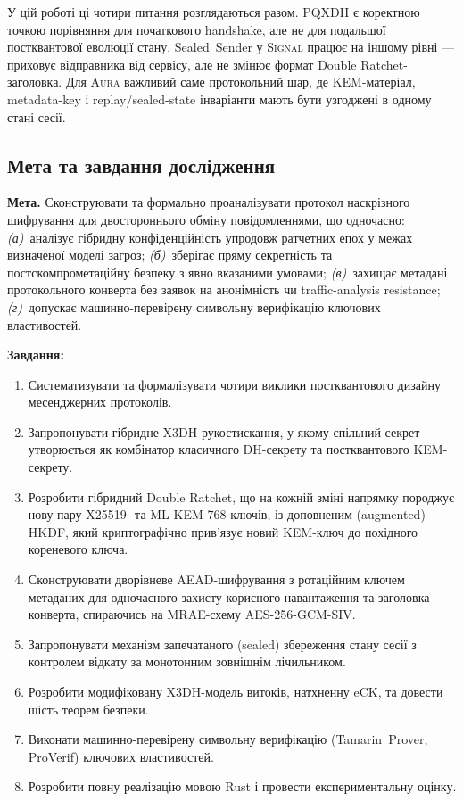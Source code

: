 \documentclass[11pt,a4paper]{article}
\theoremstyle{definition}
\newcommand{\AEAD}{\textsf{AES-256-GCM-SIV}}
\renewcommand{\DH}{\textsf{X25519}}
\newcommand{\KEM}{\textsf{ML-KEM-768}}
\newcommand{\eCK}{\textsf{eCK}}
\newcommand{\Aura}{\mbox{\normalfont\scshape Aura}}
\newcommand{\Signal}{\mbox{\normalfont\scshape Signal}}
\begin{document}
\medskip
У цій роботі ці чотири питання розглядаються разом. PQXDH є коректною
точкою порівняння для початкового handshake, але не для подальшої
постквантової еволюції стану. Sealed~Sender у \Signal{} працює на
іншому рівні — приховує відправника від сервісу, але не змінює формат
Double Ratchet-заголовка. Для \Aura{} важливий саме протокольний шар,
де KEM-матеріал, metadata-key і replay/sealed-state інваріанти мають
бути узгоджені в одному стані сесії.

\subsection{Мета та завдання дослідження}\label{sec:goals}

\textbf{Мета.} Сконструювати та формально проаналізувати протокол
наскрізного шифрування для двостороннього обміну повідомленнями, що
одночасно: \emph{(а)}~аналізує гібридну конфіденційність упродовж
ратчетних епох у межах визначеної моделі загроз; \emph{(б)}~зберігає
пряму секретність та постскомпрометаційну безпеку з явно вказаними
умовами; \emph{(в)}~захищає метадані протокольного конверта без
заявок на анонімність чи traffic-analysis resistance; \emph{(г)}~допускає
машинно-перевірену символьну верифікацію ключових властивостей.

\textbf{Завдання:}
\begin{enumerate}
  \item Систематизувати та формалізувати чотири виклики постквантового
    дизайну месенджерних протоколів.
  \item Запропонувати гібридне X3DH-рукостискання, у якому
    спільний секрет утворюється як комбінатор класичного DH-секрету
    та постквантового KEM-секрету.
  \item Розробити гібридний Double Ratchet, що на кожній зміні напрямку
    породжує нову пару \DH{}- та \KEM{}-ключів, із доповненим (augmented)
    HKDF, який криптографічно прив'язує новий KEM-ключ до похідного
    кореневого ключа.
  \item Сконструювати дворівневе AEAD-шифрування з ротаційним ключем
    метаданих для одночасного захисту корисного навантаження та
    заголовка конверта, спираючись на MRAE-схему \AEAD{}.
  \item Запропонувати механізм запечатаного (sealed) збереження стану
    сесії з контролем відкату за монотонним зовнішнім лічильником.
  \item Розробити модифіковану X3DH-модель витоків, натхненну \eCK{}, та довести
    шість теорем безпеки.
  \item Виконати машинно-перевірену символьну верифікацію
    (Tamarin~Prover, ProVerif) ключових властивостей.
  \item Розробити повну реалізацію мовою Rust і провести експериментальну
    оцінку.
\end{enumerate}
\end{document}

